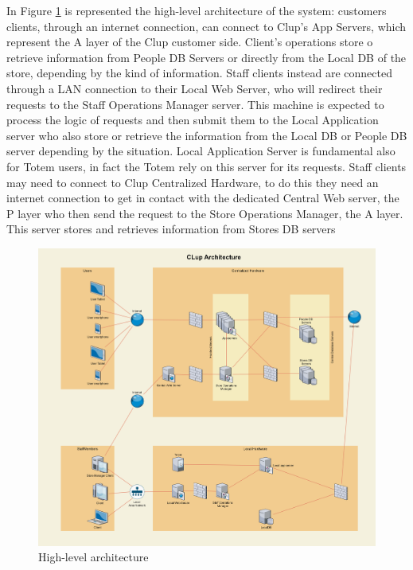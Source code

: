 In Figure \ref{fig:HLArch} is represented the high-level architecture of the system: customers clients, through an internet connection, can connect to Clup's App Servers, which represent the A layer of the Clup customer side. Client's operations store o retrieve information from People DB Servers or directly from the Local DB of the store, depending by the kind of information. Staff clients instead are connected through a LAN connection to their Local Web Server, who will redirect their requests to the Staff Operations Manager server. This machine is expected to process the logic of requests and then submit them to the Local Application server who also store or retrieve the information from the Local DB or People DB server depending by the situation. Local Application Server is fundamental also for Totem users, in fact the Totem rely on this server for its requests. Staff clients may need to connect to Clup Centralized Hardware, to do this they need an internet connection to get in contact with the dedicated Central Web server, the P layer who then send the request to the Store Operations Manager, the A layer. This server stores and retrieves information from Stores DB servers

\begin{figure}[h!]
	\includegraphics[width=\linewidth]{../Diagrams/Archtecture/Architecture_diagram.png}
	\caption{High-level architecture}
	\label{fig:HLArch}
\end{figure}
\newpage
